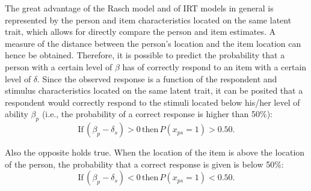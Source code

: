 \documentclass[12pt]{book}
\begin{document}
The great advantage of the Rasch model and of IRT models in general is represented by the person and item characteristics located on the same latent trait, which allows for directly compare the person and item estimates.
A measure of the distance between the person's location and the item location can hence be obtained. Therefore, it is possible to predict the probability that a person with a certain level of $\beta$ has of correctly respond to an item with a certain level of $\delta$. 
Since the observed response is a function of the respondent and stimulus characteristics located on the same latent trait, it can be posited that a respondent would correctly respond to the stimuli located below his/her level of ability $\beta_p$ (i.e., the probability of a correct response is higher than 50\%): 
\begin{equation}\label{eq:rasch1}
	\text{If} \, (\beta_p - \delta_s) > 0 \, \text{then} \, P(x_{ps} = 1) > 0.50.
\end{equation}

Also the opposite holds true. When the location of the item is above the location of the person, the probability that a correct response is given is below 50\%: 
\begin{equation}\label{eq:rasch2}
	\text{If} \, (\beta_p - \delta_s) < 0 \, \text{then} \, P(x_{ps} = 1) < 0.50.
\end{equation}
\end{document}
